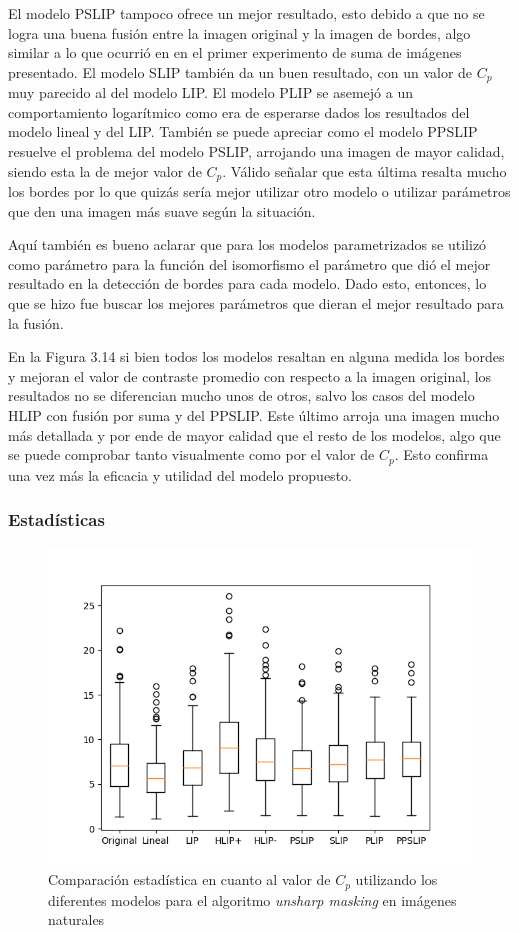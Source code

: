 El modelo PSLIP tampoco ofrece un mejor resultado, esto debido a que no se logra una buena fusi\'on entre la imagen original y la imagen de bordes, algo similar a lo que ocurri\'o en en el primer experimento de suma de im\'agenes presentado. El modelo SLIP tambi\'en da un buen resultado, con un valor de $C_p$ muy parecido al del modelo LIP. El modelo PLIP se asemej\'o a un comportamiento logar\'itmico como era de esperarse dados los resultados del modelo lineal y del LIP. Tambi\'en se puede apreciar como el modelo PPSLIP resuelve el problema del modelo PSLIP, arrojando una imagen de mayor calidad, siendo esta la de mejor valor de $C_p$. V\'alido se\~nalar que esta \'ultima resalta mucho los bordes por lo que quiz\'as ser\'ia mejor utilizar otro modelo o utilizar par\'ametros que den una imagen m\'as suave seg\'un la situaci\'on.

Aqu\'i tambi\'en es bueno aclarar que para los modelos parametrizados se utiliz\'o como par\'ametro para la funci\'on del isomorfismo el par\'ametro que di\'o el mejor resultado en la detecci\'on de bordes para cada modelo. Dado esto, entonces, lo que se hizo fue buscar los mejores par\'ametros que dieran el mejor resultado para la fusi\'on.

En la Figura 3.14 si bien todos los modelos resaltan en alguna medida los bordes y mejoran el valor de contraste promedio con respecto a la imagen original, los resultados no se diferencian mucho unos de otros, salvo los casos del modelo HLIP con fusi\'on por suma y del PPSLIP. Este \'ultimo arroja una imagen mucho m\'as detallada y por ende de mayor calidad que el resto de los modelos, algo que se puede comprobar tanto visualmente como por el valor de $C_p$. Esto confirma una vez m\'as la eficacia y utilidad del modelo propuesto.

\subsubsection{Estad\'isticas}

\begin{figure}
	\begin{center}
		\includegraphics[width=10.0 cm]{images/graphics/natural/unsharp_masking/um_all.png}
		\caption{Comparaci\'on estad\'istica en cuanto al valor de $C_p$ utilizando los diferentes modelos para el algoritmo \textit{unsharp masking} en im\'agenes naturales}
	\end{center}
\end{figure}

